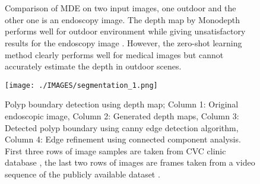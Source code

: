 \documentclass[journal]{IEEEtran}
\begin{document}
\begin{figure}[h]
\centering     %
{}
\\
\\
\caption{Comparison of MDE on two input images, one outdoor and the other one is an endoscopy image. The depth map by Monodepth \cite{godard2017unsupervised} performs well for outdoor environment while giving unsatisfactory results for the endoscopy image . However, the zero-shot learning method \cite{lasinger2019towards} clearly performs well for medical images but cannot accurately estimate the depth in outdoor scenes. }
\label{comp}
\end{figure}
\begin{figure}
\centering     %
\texttt{[image: ./IMAGES/segmentation\_1.png]}
\caption{Polyp boundary detection using depth map; Column 1: Original endoscopic image, Column 2: Generated depth maps, Column 3: Detected polyp boundary using canny edge detection algorithm, Column 4: Edge refinement using connected component analysis.  First three rows of image samples are taken from CVC clinic database \cite{bernal2015wm}, the last two rows of images are frames taken from a video sequence of the publicly available dataset \cite{mesejo2016computer}.}
\label{segmentation:examples}
\end{figure}
\end{document}
